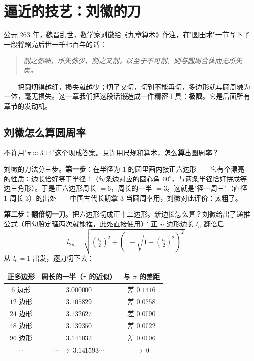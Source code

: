 \chapter{逼近的技艺：刘徽的刀}

公元 263 年，魏晋乱世，数学家刘徽给《九章算术》作注，在"圆田术"一节写下了一段将照亮后世一千七百年的话：

\begin{quote}\centering\itshape
割之弥细，所失弥少，割之又割，以至于不可割，则与圆周合体而无所失矣。
\end{quote}

——把圆切得越细，损失就越少；切了又切，切到不能再切，多边形就与圆周融为一体，毫无损失。这一章我们把这段话锻造成一件精密工具：\textbf{极限}。它是后面所有章节的发动机。

\section{刘徽怎么算圆周率}

\begin{kaiwei}
不许用"$\pi \approx 3.14$"这个现成答案。只许用尺规和算术，怎么\textbf{算}出圆周率？
\end{kaiwei}

刘徽的刀法分三步。\textbf{第一步}：在半径为 $1$ 的圆里画内接正六边形——它有个漂亮的性质：边长恰好等于半径 $1$（每条边对应的圆心角 $60^\circ$，与两条半径恰好拼成等边三角形）。于是正六边形周长 $= 6$，周长的一半 $= 3$。这就是"径一周三"（直径 $1$ 周长 $3$）的出处——中国古代长期拿 $3$ 当圆周率用，刘徽对此评价：太粗了。

\textbf{第二步：翻倍切一刀}。把六边形切成正十二边形。新边长怎么算？刘徽给出了递推公式（用勾股定理两次就能推，此处直接使用）：正 $n$ 边形边长 $l_n$ 翻倍后
\[
l_{2n} = \sqrt{\left(\tfrac{l_n}{2}\right)^2 + \left(1 - \sqrt{1 - \left(\tfrac{l_n}{2}\right)^2}\right)^2\,} .
\]
从 $l_6 = 1$ 出发，逐刀切下去：

\begin{center}
\begin{tabular}{ccc}
\toprule
正多边形 & 周长的一半（$\pi$ 的近似） & 与 $\pi$ 的差距 \\
\midrule
$6$ 边形 & $3.000000$ & 差 $0.1416$ \\
$12$ 边形 & $3.105829$ & 差 $0.0358$ \\
$24$ 边形 & $3.132627$ & 差 $0.0090$ \\
$48$ 边形 & $3.139350$ & 差 $0.0022$ \\
$96$ 边形 & $3.141032$ & 差 $0.0006$ \\
$\cdots$ & $\cdots\ \to\ 3.141593\cdots$ & $\to\ 0$ \\
\bottomrule
\end{tabular}
\end{center}

